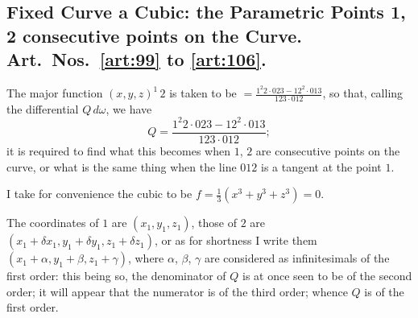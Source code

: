 \documentclass[11pt,a4paper]{book}
\begin{document}
\subsection*{Fixed Curve a Cubic: the Parametric Points 1, 2 consecutive points on the Curve. Art.~Nos.~\ref{art:99} to \ref{art:106}.}

\begin{art}\label{art:99}
The major function $(x, y, z)^1\,2$ is taken to be $= \frac{1^2 2 \cdot 023 - 12^2 \cdot 013}{123 \cdot 012}$, so that, calling the differential $Q\,d\omega$, we have
\[
Q = \frac{1^2 2 \cdot 023 - 12^2 \cdot 013}{123 \cdot 012};
\]
it is required to find what this becomes when $1$, $2$ are consecutive points on the curve, or what is the same thing when the line $012$ is a tangent at the point $1$.

I take for convenience the cubic to be $f = \frac{1}{3}(x^3 + y^3 + z^3) = 0$.

The coordinates of $1$ are $(x_1, y_1, z_1)$, those of $2$ are $(x_1 + \delta x_1, y_1 + \delta y_1, z_1 + \delta z_1)$, or as for shortness I write them $(x_1 + \alpha, y_1 + \beta, z_1 + \gamma)$, where $\alpha$, $\beta$, $\gamma$ are considered as infinitesimals of the first order: this being so, the denominator of $Q$ is at once seen to be of the second order; it will appear that the numerator is of the third order; whence $Q$ is of the first order.
\end{art}
\end{document}
